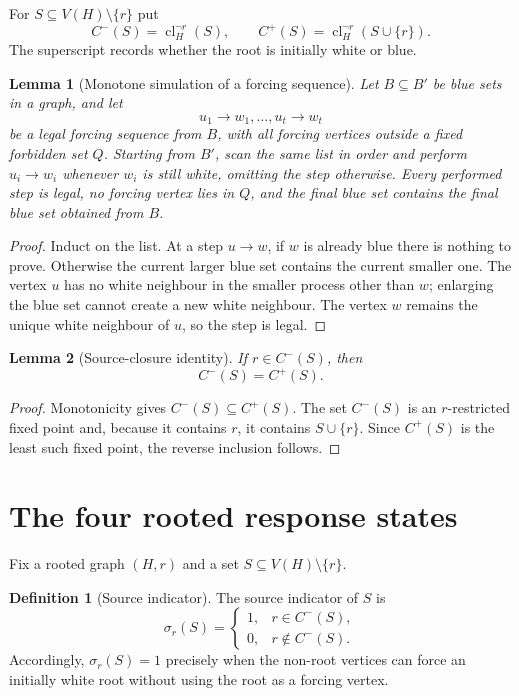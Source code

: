\documentclass[11pt,reqno]{amsart}
\newtheorem{lemma}[lemma]{Lemma}
\theoremstyle{definition}
\newtheorem{definition}[definition]{Definition}
\newcommand{\cl}{\operatorname{cl}}
\begin{document}
For $S\subseteq V(H)\setminus\{r\}$ put
\[
  C^-(S)=\cl_H^{\neg r}(S),
  \qquad
  C^+(S)=\cl_H^{\neg r}(S\cup\{r\}).
\]
The superscript records whether the root is initially white or blue.

\begin{lemma}[Monotone simulation of a forcing sequence]\label{lem:sequence-simulation}
Let $B\subseteq B'$ be blue sets in a graph, and let
\[
  u_1\to w_1,\ldots,u_t\to w_t
\]
be a legal forcing sequence from $B$, with all forcing vertices outside a fixed
forbidden set $Q$.  Starting from $B'$, scan the same list in order and perform
$u_i\to w_i$ whenever $w_i$ is still white, omitting the step otherwise.  Every
performed step is legal, no forcing vertex lies in $Q$, and the final blue set
contains the final blue set obtained from $B$.
\end{lemma}

\begin{proof}
Induct on the list.  At a step $u\to w$, if $w$ is already blue there is
nothing to prove.  Otherwise the current larger blue set contains the current
smaller one.  The vertex $u$ has no white neighbour in the smaller process
other than $w$; enlarging the blue set cannot create a new white neighbour.
The vertex $w$ remains the unique white neighbour of $u$, so the step is legal.
\end{proof}

\begin{lemma}[Source-closure identity]\label{lem:source-closure}
If $r\in C^-(S)$, then
\[
  C^-(S)=C^+(S).
\]
\end{lemma}

\begin{proof}
Monotonicity gives $C^-(S)\subseteq C^+(S)$.  The set $C^-(S)$ is an
$r$-restricted fixed point and, because it contains $r$, it contains
$S\cup\{r\}$.  Since $C^+(S)$ is the least such fixed point, the reverse
inclusion follows.
\end{proof}

\section{The four rooted response states}\label{sec:states}

Fix a rooted graph $(H,r)$ and a set $S\subseteq V(H)\setminus\{r\}$.

\begin{definition}[Source indicator]
The source indicator of $S$ is
\[
  \sigma_r(S)=
  \begin{cases}
    1,&r\in C^-(S),\\
    0,&r\notin C^-(S).
  \end{cases}
\]
Accordingly, $\sigma_r(S)=1$ precisely when the non-root vertices can force an initially white root without using the root as a forcing vertex.
\end{definition}
\end{document}
